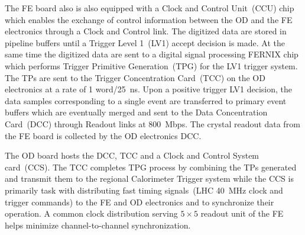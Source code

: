 \newline
The FE board also is also equipped with a Clock and Control Unit~(CCU) chip which enables the exchange of control information between the OD and the FE electronics through a Clock and Control link.
\newline
The digitized data  are stored in pipeline buffers until a Trigger Level 1~(LV1) accept decision is made. At the same time the digitized data are sent to a digital signal processing FERNIX chip which performs Trigger Primitive Generation~(TPG) for the LV1 trigger system. The TPs are sent to the Trigger Concentration Card~(TCC) on the OD electronics at a rate of 1 word/25~ns.
Upon a positive trigger LV1 decision, the data samples corresponding to a single event are transferred to primary event buffers which are eventually merged and sent to the Data Concentration Card~(DCC) through Readout links at 800~Mbps. The crystal readout data from the FE board is collected by the OD electronics DCC.
\par 
  The OD board hosts the DCC, TCC and a Clock and Control System card~(CCS). The TCC completes TPG process by combining the TPs generated and transmit them to the regional Calorimeter Trigger system while the CCS is primarily task with distributing fast timing signals~(LHC 40~MHz clock and trigger commands) to the FE and OD electronics and to synchronize their operation. 
A common clock distribution serving $5\times5$ readout unit of the FE helps minimize channel-to-channel synchronization.
